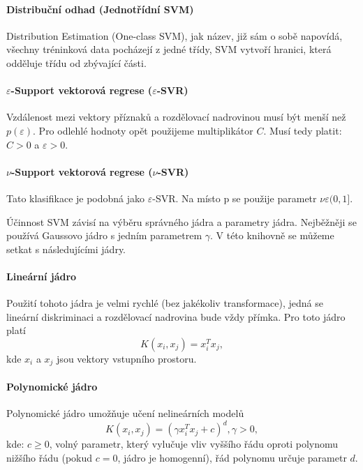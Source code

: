 \paragraph*{Distribuční odhad (Jednotřídní SVM)}
Distribution Estimation (One-class SVM), jak název, již sám o sobě napovídá, všechny tréninková data pocházejí z jedné třídy, SVM vytvoří hranici, která odděluje třídu od zbývající části. \cite{oneclasssvm}

\paragraph*{$\varepsilon$-Support vektorová regrese ($\varepsilon$-SVR)}
Vzdálenost mezi vektory příznaků a rozdělovací nadrovinou musí být menší než $p (\varepsilon)$. Pro odlehlé hodnoty opět použijeme multiplikátor $C$. Musí tedy platit: $C > 0$ a $\varepsilon > 0$. \cite{svrsvm}

\paragraph*{$\nu$-Support vektorová regrese ($\nu$-SVR)}
Tato klasifikace je podobná jako $\varepsilon$-SVR. Na místo p se použije parametr $\nu \varepsilon (0,1]$. \cite{nusvmsvrclass}

Účinnost SVM závisí na výběru správného jádra a parametry jádra. Nejběžněji se používá Gaussovo jádro s jedním parametrem $\gamma$. V této knihovně se můžeme setkat s následujícími jádry.

\paragraph*{Lineární jádro}
Použití tohoto jádra je velmi rychlé (bez jakékoliv transformace), jedná se lineární diskriminaci a rozdělovací nadrovina bude vždy přímka. Pro toto jádro platí 
\begin{equation*}
 \label{linearK}
  K(x_i, x_j) = x_i^T x_j,
\end{equation*}
  kde $x_i$ a $x_j$ jsou vektory vstupního prostoru.

\paragraph*{Polynomické jádro}
Polynomické jádro umožňuje učení nelineárních modelů
\begin{equation*}
\label{polyK}
  K(x_i, x_j) = (\gamma x_i^T x_j + c)^{d}, \gamma > 0,
\end{equation*}
kde: $c \geq 0$, volný parametr, který vylučuje vliv vyššího řádu oproti polynomu nižšího řádu (pokud $c = 0$, jádro je homogenní), řád polynomu určuje parametr $d$.


